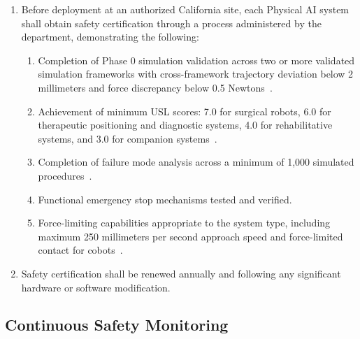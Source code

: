\documentclass[11pt,letterpaper]{article}
\begin{document}
\begin{enumerate}[label=(\alph*)]
\item Before deployment at an authorized California site, each Physical AI
  system shall obtain safety certification through a process administered by
  the department, demonstrating the following:
  \begin{enumerate}[label=(\arabic*)]
  \item Completion of Phase 0 simulation validation across two or more
    validated simulation frameworks with cross-framework trajectory deviation
    below 2 millimeters and force discrepancy below 0.5
    Newtons~\cite{iche6r3adapt}.
  \item Achievement of minimum USL scores: 7.0 for surgical robots, 6.0 for
    therapeutic positioning and diagnostic systems, 4.0 for rehabilitative
    systems, and 3.0 for companion systems~\cite{cfr50adapt}.
  \item Completion of failure mode analysis across a minimum of 1,000
    simulated procedures~\cite{cfr312adapt}.
  \item Functional emergency stop mechanisms tested and verified.
  \item Force-limiting capabilities appropriate to the system type, including
    maximum 250 millimeters per second approach speed and force-limited contact
    for cobots~\cite{patientinstructions2026}.
  \end{enumerate}

\item Safety certification shall be renewed annually and following any
  significant hardware or software modification.
\end{enumerate}

\subsection{Continuous Safety Monitoring}
\end{document}

